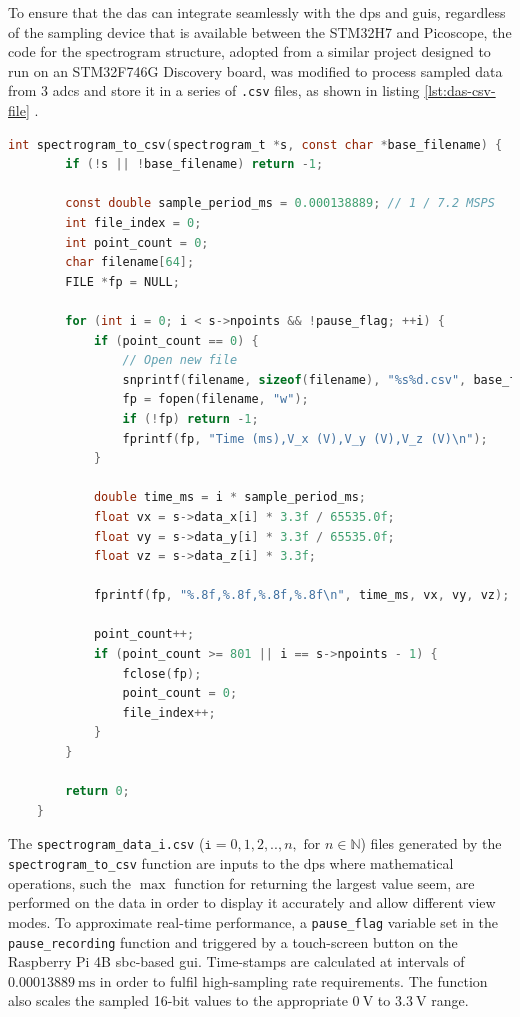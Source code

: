 \documentclass[class=report,11pt,crop=false]{standalone}
\begin{document}
	To ensure that the \acrshort{das} can integrate seamlessly with the \acrfull{dps} and \acrfull{guis}, regardless of the sampling device that is available between the STM32H7 and Picoscope, the code for the spectrogram structure, adopted from a similar project designed to run on an STM32F746G Discovery board, was modified to process sampled data from 3 \acrshort{adc}s and store it in a series of \texttt{.csv} files, as shown in listing \ref{lst:das-csv-file} \cite{sebgithub2024}. 
	\begin{lstlisting}[language=C, label={lst:das-csv-file}, caption={Code snippet of the function for storing the interleaved sampling data in a \texttt{.csv}.}]
	int spectrogram_to_csv(spectrogram_t *s, const char *base_filename) {
		if (!s || !base_filename) return -1;
		
		const double sample_period_ms = 0.000138889; // 1 / 7.2 MSPS
		int file_index = 0;
		int point_count = 0;
		char filename[64];
		FILE *fp = NULL;
		
		for (int i = 0; i < s->npoints && !pause_flag; ++i) {
			if (point_count == 0) {
				// Open new file
				snprintf(filename, sizeof(filename), "%s%d.csv", base_filename, file_index);
				fp = fopen(filename, "w");
				if (!fp) return -1;
				fprintf(fp, "Time (ms),V_x (V),V_y (V),V_z (V)\n");
			}
			
			double time_ms = i * sample_period_ms;
			float vx = s->data_x[i] * 3.3f / 65535.0f;
			float vy = s->data_y[i] * 3.3f / 65535.0f;
			float vz = s->data_z[i] * 3.3f;
			
			fprintf(fp, "%.8f,%.8f,%.8f,%.8f\n", time_ms, vx, vy, vz);
			
			point_count++;
			if (point_count >= 801 || i == s->npoints - 1) {
				fclose(fp);
				point_count = 0;
				file_index++;
			}
		}
		
		return 0;
	}
	\end{lstlisting}
	The \texttt{spectrogram\_data\_i.csv} ($\texttt{i}=0,1,2,..,n, \text{ for }n \in \mathbb{N}$) files generated by the \texttt{spectrogram\_to\_csv} function are inputs to the \acrshort{dps} where mathematical operations, such the $\max$ function for returning the largest value seem, are performed on the data in order to display it accurately and allow different view modes. To approximate real-time performance, a \texttt{pause\_flag} variable set in the \texttt{pause\_recording} function and triggered by a touch-screen button on the Raspberry Pi 4B \acrshort{sbc}-based \acrshort{gui}. Time-stamps are calculated at intervals of $\SI{0.00013889}{\milli\second}$ in order to fulfil high-sampling rate requirements. The function also scales the sampled 16-bit values to the appropriate $\SI{0}{\volt}$ to $\SI{3.3}{\volt}$ range. 
\end{document}
